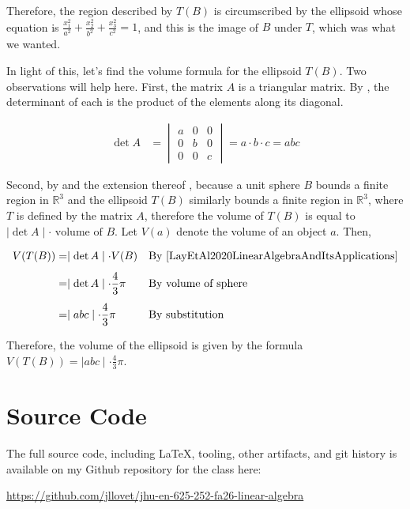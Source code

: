 \documentclass[10pt,letterpaper,final]{report}
\newcommand{\reason}[1]{&& \text{#1}}
\begin{document}
Therefore, the region described by $T(B)$ is circumscribed by the ellipsoid whose equation is $\frac{x_1^2}{a^2} + \frac{x_2^2}{b^2} + \frac{x_3^2}{c^2} = 1$, and this is the image of $B$ under $T$, which was what we wanted.

In light of this, let's find the volume formula for the ellipsoid $T(B)$. Two observations will help here. First, the matrix $A$ is a triangular matrix. By \cite[Theorem 3.2, Ch. 3.1, p.~175]{LayEtAl2020LinearAlgebraAndItsApplications}, the determinant of each is the product of the elements along its diagonal.

\begin{align*}
  \det A & = \begin{vmatrix}
               a & 0 & 0 \\
               0 & b & 0 \\
               0 & 0 & c
             \end{vmatrix} = a \cdot b \cdot c = abc
\end{align*}

Second, by \cite[Theorem 3.10, Ch. 3.3, p.~193]{LayEtAl2020LinearAlgebraAndItsApplications} and the extension thereof \cite[Ch. 3.3, p.~195]{LayEtAl2020LinearAlgebraAndItsApplications}, because a unit sphere $B$ bounds a finite region in $\mathbb{R}^3$ and the ellipsoid $T(B)$ similarly bounds a finite region in $\mathbb{R}^3$, where $T$ is defined by the matrix $A$, therefore the volume of $T(B)$ is equal to $\mid \det A \mid \cdot \text{ volume of } B$. Let $V(a)$ denote the volume of an object $a$. Then,

\begin{align*}
  V(T(B)) & = \mid \det A \mid \cdot V(B) \reason{By \cite[Theorem 3.10, Ch. 3.3, p.~193]{LayEtAl2020LinearAlgebraAndItsApplications}} \\[1ex]
          & = \mid \det A \mid \cdot \frac{4}{3}\pi \reason{By volume of sphere}                                                       \\[1ex]
          & = \mid abc \mid \cdot \frac{4}{3}\pi \reason{By substitution}
\end{align*}

Therefore, the volume of the ellipsoid is given by the formula $V(T(B)) = \mid abc \mid \cdot \frac{4}{3}\pi$.

\pagebreak

\section*{Source Code}
The full source code, including LaTeX, tooling, other artifacts, and git history is available on my Github repository for the class here:
\begin{center}
  \url{https://github.com/jllovet/jhu-en-625-252-fa26-linear-algebra}
\end{center}

\printbibliography
\end{document}
